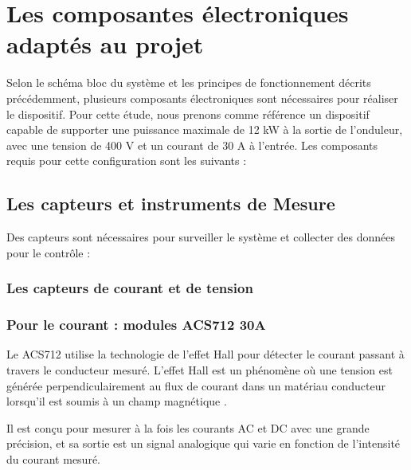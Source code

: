 \section{Les composantes électroniques adaptés au projet}

Selon le schéma bloc du système et les principes de fonctionnement décrits précédemment, plusieurs composants électroniques sont nécessaires pour réaliser le dispositif. Pour cette étude, nous prenons comme référence un dispositif capable de supporter une puissance maximale de 12 kW à la sortie de l'onduleur, avec une tension de 400 V et un courant de 30 A à l'entrée. Les composants requis pour cette configuration sont les suivants :

\subsection{Les capteurs et instruments de Mesure}

Des capteurs sont nécessaires pour surveiller le système et collecter des données pour le contrôle :

\subsubsection{Les capteurs de courant et de tension }
\subsubsection*{Pour le courant : modules ACS712 30A}

Le ACS712 utilise la technologie de l'effet Hall pour détecter le courant passant à travers le conducteur mesuré. L'effet Hall est un phénomène où une tension est générée perpendiculairement au flux de courant dans un matériau conducteur lorsqu'il est soumis à un champ magnétique  \cite{1}.

Il est conçu pour mesurer à la fois les courants AC et DC avec une grande précision, et sa sortie est un signal analogique qui varie en fonction de l'intensité du courant mesuré.


